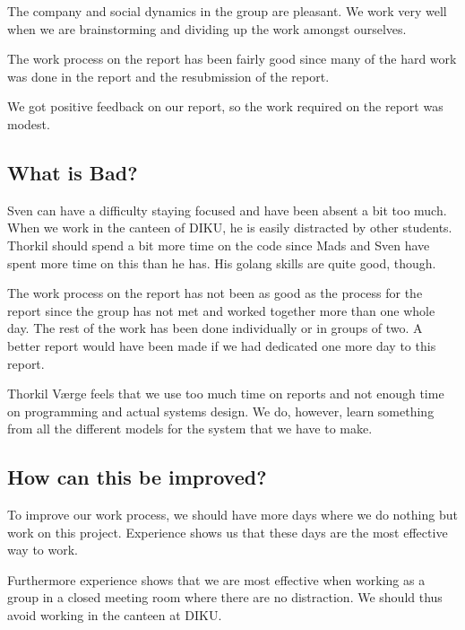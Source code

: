 \documentclass[11pt,a4paper]{report}
\begin{document}
The company and social dynamics in the group are pleasant. We work very well when we are brainstorming and dividing up the work amongst ourselves.

The work process on the  report has been fairly good since many of the hard work was done in the  report and the resubmission of the  report.

We got positive feedback on our  report, so the work required on the  report was modest.

\subsection{What is Bad?}
Sven can have a difficulty staying focused and have been absent a bit too much. When we work in the canteen of DIKU, he is easily distracted by other students. Thorkil should spend a bit more time on the code since Mads and Sven have spent more time on this than he has. His golang skills are quite good, though.

The work process on the  report has not been as good as the process for the  report since the group has not met and worked together more than one whole day. The rest of the work has been done individually or in groups of two. A better report would have been made if we had dedicated one more day to this report.

Thorkil Værge feels that we use too much time on reports and not enough time on programming and actual systems design. We do, however, learn something from all the different models for the system that we have to make.

\subsection{How can this be improved?}
To improve our work process, we should have more days where we do nothing but work on this project. Experience shows us that these days are the most effective way to work.

Furthermore experience shows that we are most effective when working as a group in a closed meeting room where there are no distraction. We should thus avoid working in the canteen at DIKU.
\end{document}
